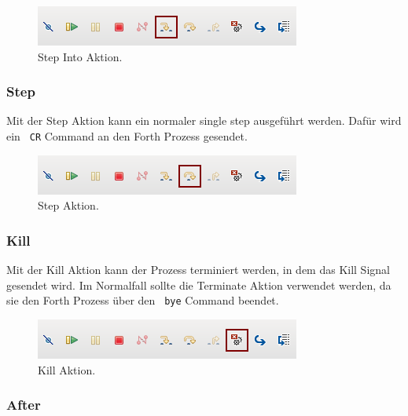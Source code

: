 \begin{figure}[H]
	\centering
		\includegraphics[scale=1]{debugger/stepinto.png}
		\caption{Step Into Aktion.}
		\label{fig:stepinto}
\end{figure}

\newpage

\subsubsection{Step}

Mit der Step Aktion kann ein normaler single step ausgeführt werden. Dafür wird ein \verb! CR! Command an den Forth Prozess gesendet.

\begin{figure}[H]
	\centering
		\includegraphics[scale=1]{debugger/step.png}
		\caption{Step Aktion.}
		\label{fig:step}
\end{figure}

\subsubsection{Kill}

Mit der Kill Aktion kann der Prozess terminiert werden, in dem das Kill Signal gesendet wird. Im Normalfall sollte die Terminate Aktion verwendet werden, da sie den Forth Prozess über den \verb! bye! Command beendet.

\begin{figure}[H]
	\centering
		\includegraphics[scale=1]{debugger/kill.png}
		\caption{Kill Aktion.}
		\label{fig:kill}
\end{figure}

\subsubsection{After}

